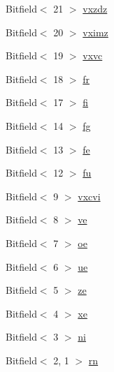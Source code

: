 \begin{DoxyCompactItemize}
Bitfield$<$ 21 $>$ \hyperlink{namespacePowerISA_a484b11649bb251dab5cb3620bd4af9a3}{vxzdz}
\item 
Bitfield$<$ 20 $>$ \hyperlink{namespacePowerISA_abba495fcc654dc32f269467125b79a96}{vximz}
\item 
Bitfield$<$ 19 $>$ \hyperlink{namespacePowerISA_ab0da869ddd9a97bd961ccba251a0ac9c}{vxvc}
\item 
Bitfield$<$ 18 $>$ \hyperlink{namespacePowerISA_a17876013db28062a38acd45cf40eac37}{fr}
\item 
Bitfield$<$ 17 $>$ \hyperlink{namespacePowerISA_ad1ab6d62c8f46570392bf3884625e17e}{fi}
\item 
Bitfield$<$ 14 $>$ \hyperlink{namespacePowerISA_a4df80832d2905b80a0f14fc0257e6cf9}{fg}
\item 
Bitfield$<$ 13 $>$ \hyperlink{namespacePowerISA_ac246f57732ad71b0d35db5adfe68e70d}{fe}
\item 
Bitfield$<$ 12 $>$ \hyperlink{namespacePowerISA_a48111db89d0875c9e050dafabe22e436}{fu}
\item 
Bitfield$<$ 9 $>$ \hyperlink{namespacePowerISA_a94d7f439bb54d3d17a16e882442f505e}{vxcvi}
\item 
Bitfield$<$ 8 $>$ \hyperlink{namespacePowerISA_ad4dee47434647869e86af6c9a1532c4c}{ve}
\item 
Bitfield$<$ 7 $>$ \hyperlink{namespacePowerISA_a63100c617cc64be1e6989c06e7ec9bbd}{oe}
\item 
Bitfield$<$ 6 $>$ \hyperlink{namespacePowerISA_ace34d12eaff464fd4f02c16f05a74ce4}{ue}
\item 
Bitfield$<$ 5 $>$ \hyperlink{namespacePowerISA_abaa15e2a12a97373049e45235a31cd99}{ze}
\item 
Bitfield$<$ 4 $>$ \hyperlink{namespacePowerISA_a70bcc69fe941d4edd3f8239fcdb91f52}{xe}
\item 
Bitfield$<$ 3 $>$ \hyperlink{namespacePowerISA_a0d135b3f711d2c44104273381230e399}{ni}
\item 
Bitfield$<$ 2, 1 $>$ \hyperlink{namespacePowerISA_a238ac7c30c274b7ce621e9d24eca07fb}{rn}
\end{DoxyCompactItemize}
